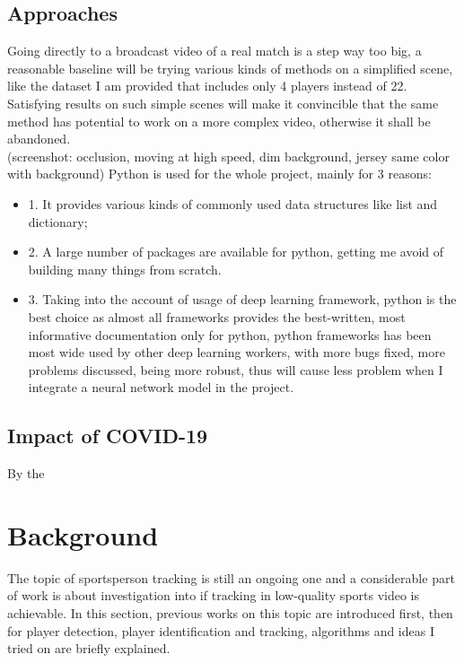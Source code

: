 \documentclass{article}
\begin{document}
\subsection{Approaches}
Going directly to a broadcast video of a real match is a step way too big, a reasonable baseline will be trying various kinds of methods on a simplified scene, like the dataset I am provided that includes only 4 players instead of 22. Satisfying results on such simple scenes will make it convincible that the same method has potential to work on a more complex video, otherwise it shall be abandoned.\\
(screenshot: occlusion, moving at high speed, dim background, jersey same color with background)
Python is used for the whole project, mainly for 3 reasons:
\begin{itemize}
\item 1. It provides various kinds of commonly used data structures like list and dictionary;
\item 2. A large number of packages are available for python, getting me avoid of building many things from scratch.
\item 3. Taking into the account of usage of deep learning framework, python is the best choice as almost all frameworks provides the best-written, most informative documentation only for python, python frameworks has been most wide used by other deep learning workers, with more bugs fixed, more problems discussed, being more robust, thus will cause less problem when I integrate a neural network model in the project.
\end{itemize}
\subsection{Impact of COVID-19}
By the 
\newpage

\section{Background}
The topic of sportsperson tracking is still an ongoing one and a considerable part of work is about investigation into if tracking in low-quality sports video is achievable. In this section, previous works on this topic are introduced first, then for player detection, player identification and tracking, algorithms and ideas I tried on are briefly explained.
\end{document}
